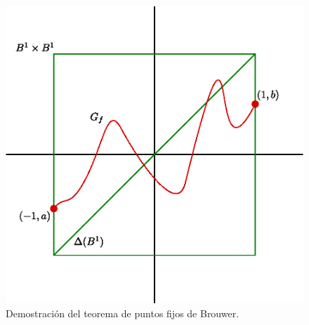 \begin{figure}[h]
    \centering
    \includegraphics[scale=0.8]{Figures/brouwers_thm_1.eps}
    \caption{Demostraci\'on del teorema de puntos fijos de Brouwer.}
    \label{fig_2}
\end{figure}
